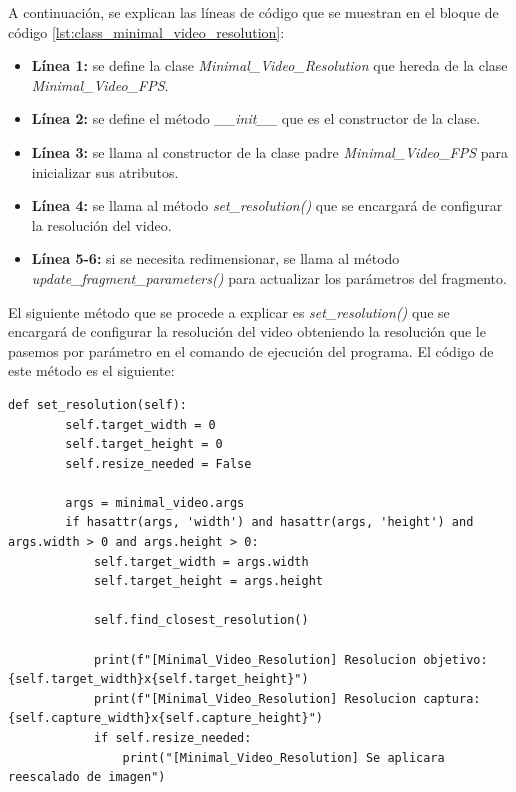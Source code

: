A continuación, se explican las líneas de código que se muestran en el bloque de código \ref{lst:class_minimal_video_resolution}:
\begin{itemize}
    \item \textbf{Línea 1:} se define la clase \textit{Minimal\_Video\_Resolution} que hereda de la clase \textit{Minimal\_Video\_FPS}.
    \item \textbf{Línea 2:} se define el método \textit{\_\_init\_\_} que es el constructor de la clase.
    \item \textbf{Línea 3:} se llama al constructor de la clase padre \textit{Minimal\_Video\_FPS} para inicializar sus atributos.
    \item \textbf{Línea 4:} se llama al método \textit{set\_resolution()} que se encargará de configurar la resolución del video.
    \item \textbf{Línea 5-6:} si se necesita redimensionar, se llama al método \textit{update\_fragment\_parameters()} para actualizar los parámetros del fragmento.
\end{itemize}
\vspace{\baselineskip}

El siguiente método que se procede a explicar es \textit{set\_resolution()} que se encargará de configurar la resolución del video obteniendo la resolución que le pasemos por parámetro en el comando de ejecución del programa. El código de este método es el siguiente:
\begin{lstlisting}[style=pythonstyle, caption={Método set\_resolution() de \textit{Minimal\_Video\_Resolution}}, label={lst:set_resolution_minimal_video_resolution}]
def set_resolution(self):
        self.target_width = 0
        self.target_height = 0
        self.resize_needed = False

        args = minimal_video.args
        if hasattr(args, 'width') and hasattr(args, 'height') and args.width > 0 and args.height > 0:
            self.target_width = args.width
            self.target_height = args.height

            self.find_closest_resolution()

            print(f"[Minimal_Video_Resolution] Resolucion objetivo: {self.target_width}x{self.target_height}")
            print(f"[Minimal_Video_Resolution] Resolucion captura: {self.capture_width}x{self.capture_height}")
            if self.resize_needed:
                print("[Minimal_Video_Resolution] Se aplicara reescalado de imagen")
\end{lstlisting}
\vspace{\baselineskip}

